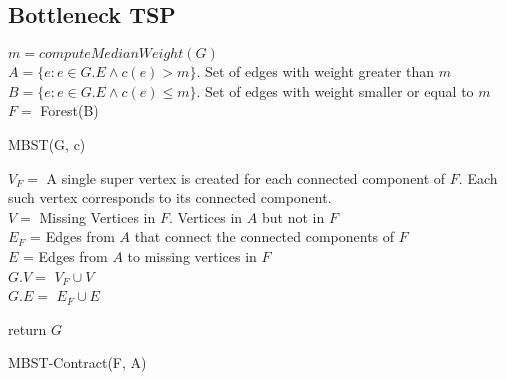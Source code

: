 \documentclass[runningheads, a4paper]{llncs}
\begin{document}
\subsection{Bottleneck TSP}


\begin{algorithm}[h]
    
    
    $m = computeMedianWeight(G)$ \\
    $A = \{e : {e {\in G.E}} \land c(e) > m \}$. Set of edges with weight greater than $m$ \\
    $B = \{e : {e{\in G.E}} \land c(e) \leq m \}$. Set of edges with weight smaller or equal to $m$ \\
    $F =$ Forest(B) \\
    
    
    \caption{MBST(G, c)}
    \label{alg:mbst}
\end{algorithm}

\begin{algorithm}[h]
  
    $V_{F} = $ A single super vertex is created for each connected component of $F$. Each such vertex corresponds to its connected component. \\
    $V = $ Missing Vertices in $F$. Vertices in $A$ but not in $F$ \\
    
    $E_{F}$ = Edges from $A$ that connect the connected components of $F$\\
    $E$ = Edges from $A$ to missing vertices in $F$ \\
    
    $G.V = $ $V_{F} \cup V $ \\
    $G.E = $ $E_{F} \cup E $
    
    return $G$

    \caption{MBST-Contract(F, A)}
    \label{alg:mbst_contract}
\end{algorithm}
\end{document}
